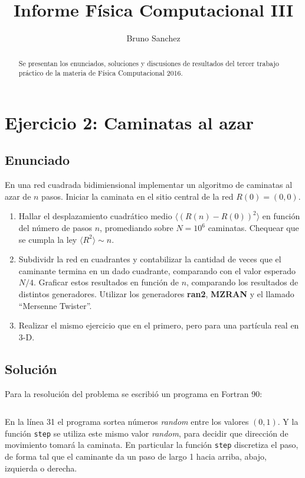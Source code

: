 \documentclass[a4paper,10pt]{paper}
\title{Informe F\'isica Computacional III}
\author{Bruno Sanchez}
\begin{document}
\maketitle

\begin{abstract}
Se presentan los enunciados, soluciones y discusiones de resultados del tercer trabajo pr\'actico
de la materia de F\'{i}sica Computacional 2016.
\end{abstract}


\section{Ejercicio 2: Caminatas al azar}
\subsection{Enunciado}
 En una red cuadrada bidimiensional implementar un algoritmo de caminatas al azar de $n$ pasos. Iniciar la
 caminata en el sitio central de la red $R(0) = (0,0)$.
 \begin{enumerate}
  \item Hallar el desplazamiento cuadr\'atico medio 
  $\langle(R(n) - R(0))^2\rangle$ en funci\'on del n\'umero
  de pasos $n$, promediando sobre $N=10^6$ caminatas. 
  Chequear que se cumpla la ley $\langle R^2\rangle\sim n$.
  \item Subdividr la red en cuadrantes y contabilizar la cantidad de veces que el caminante termina
  en un dado cuadrante, comparando con el valor esperado $N/4$. Graficar estos resultados en funci\'on
  de $n$, comparando los resultados de distintos generadores. 
  Utilizar los generadores \textbf{ran2}, \textbf{MZRAN} y el llamado ``Mersenne Twister''.
  \item Realizar el mismo ejercicio que en el primero, pero para una part\'icula real en 3-D.
 \end{enumerate}

\subsection{Soluci\'on}
 Para la resoluci\'on del problema se escribi\'o un programa en Fortran 90: 
 \inputminted[firstline=16, linenos, firstnumber=1]{fortran}{../ej2ab.f90}
 
 En la l\'inea 31 el programa sortea n\'umeros \textit{random} entre los valores $(0, 1)$.
 Y la funci\'on \texttt{step} se utiliza este mismo valor \textit{random}, para decidir que direcci\'on
 de movimiento tomar\'a la caminata. En particular la funci\'on \texttt{step} discretiza el paso, de
 forma tal que el caminante da un paso de largo 1 hacia arriba, abajo, izquierda o derecha.
 
\end{document}
